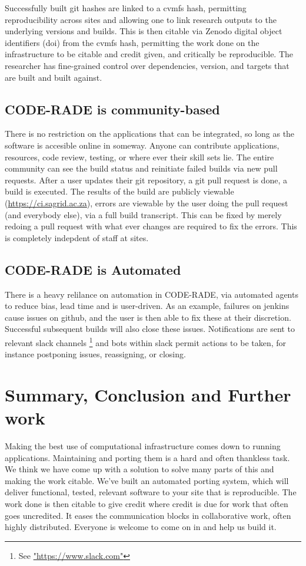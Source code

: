 \documentclass[a4paper]{jpconf}
\begin{document}
Successfully built git hashes are linked to a cvmfs hash, permitting reproducibility across sites and 
allowing one to link research outputs to the underlying versions and builds. This is then citable via
Zenodo digital object identifiers (doi) from the cvmfs hash, permitting the work done on the 
infrastructure to be citable and credit given, and critically be reproducible.
The researcher has fine-grained control over dependencies, version, and targets that are built
and built against. 

\subsection{CODE-RADE is community-based}
There is no restriction on the applications that can be integrated, so long as the software is accesible
online in someway. Anyone can contribute applications, resources, code review, testing, or
where ever their skill sets lie. 
The entire community can see the build status and reinitiate failed builds via new pull requests.
After a user updates their git repository, a git pull request is done, a build is executed. 
The results of the build are publicly viewable (\url{https://ci.sagrid.ac.za}), 
errors are viewable by the user doing the pull request (and everybody else), via a full build transcript.
This can be fixed
by merely redoing a pull request with what ever changes are required to fix the errors. 
This is completely indepdent of staff at sites.

\subsection{CODE-RADE is Automated}

There is a heavy relilance on automation in CODE-RADE, via automated agents to reduce bias, lead time
and is user-driven.
As an example, failures on jenkins cause issues on github, and the user is then able to fix these at
their discretion.
Successful subsequent builds will also close these issues.
Notifications are sent to relevant slack channels \footnote{See \url{"https://www.slack.com"}} and bots within slack permit actions
to be taken, for instance postponing issues, reassigning, or closing.

\section{Summary, Conclusion and Further work}

Making the best use of computational infrastructure comes down to running applications.
Maintaining and porting them is a hard and often thankless task.
We think we have come up with a solution to solve many parts of this and making the work citable.
We've built an automated porting system, which will deliver functional, tested, relevant software to
your site that is reproducible. The work done is then citable to give credit where credit is due for work
that often goes uncredited.
It eases the communication blocks in collaborative work, often highly distributed.
Everyone is welcome to come on in and help us build it.
\end{document}
